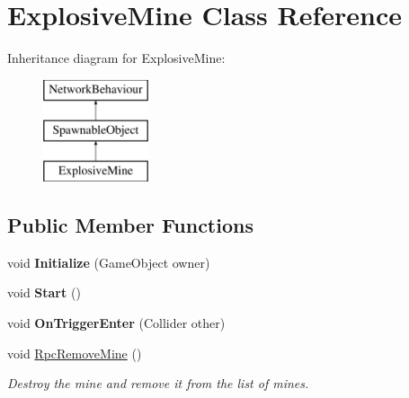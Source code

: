 \hypertarget{class_explosive_mine}{}\section{Explosive\+Mine Class Reference}
\label{class_explosive_mine}
Inheritance diagram for Explosive\+Mine\+:\begin{figure}[H]
\begin{center}
\leavevmode
\includegraphics[height=3.000000cm]{class_explosive_mine}
\end{center}
\end{figure}
\subsection*{Public Member Functions}
\begin{DoxyCompactItemize}
\item 
\hypertarget{class_explosive_mine_a7564f107a86325519f06a1b406832e90}{}\label{class_explosive_mine_a7564f107a86325519f06a1b406832e90} 
void {\bfseries Initialize} (Game\+Object owner)
\item 
\hypertarget{class_explosive_mine_a2491ad567aa0eeed0ed055967eece316}{}\label{class_explosive_mine_a2491ad567aa0eeed0ed055967eece316} 
void {\bfseries Start} ()
\item 
\hypertarget{class_explosive_mine_ac71d818fad341d830111cef2f337574b}{}\label{class_explosive_mine_ac71d818fad341d830111cef2f337574b} 
void {\bfseries On\+Trigger\+Enter} (Collider other)
\item 
void \hyperlink{class_explosive_mine_aed85961b63dd8298a1e9208f86b3b03c}{Rpc\+Remove\+Mine} ()
\begin{DoxyCompactList}\small\item\em Destroy the mine and remove it from the list of mines. \end{DoxyCompactList}\end{DoxyCompactItemize}
